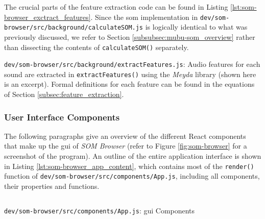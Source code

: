 \smallskip

The crucial parts of the feature extraction code can be found in Listing
\ref{lst:som-browser_exctract_features}. Since the \gls{som} implementation in
\texttt{dev/som-browser/src/background/calculateSOM.js} is logically identical
to what was previously discussed, we refer to Section
\ref{subsubsec:mubu-som_overview} rather than dissecting the contents of
\texttt{calculateSOM()} separately.

\begin{listing}[!htb]
  \caption[\texttt{dev/som-browser/src/background/extractFeatures.js}: Audio feature
  extraction]
  {\texttt{dev/som-browser/src/background/extractFeatures.js}: Audio features
  for each sound are extracted in \texttt{extractFeatures()} using the
  \textit{Meyda} library (shown here is an excerpt). Formal definitions for each
  feature can be found in the equations of Section
\ref{subsec:feature_extraction}.}
  \label{lst:som-browser_exctract_features}
\end{listing}

\subsubsection{User Interface Components}
\label{subsubsec:som-browser_components}
The following paragraphs give an overview of the different React components
that make up the \gls{gui} of \textit{SOM Browser} (refer to Figure
\ref{fig:som-browser} for a screenshot of the program). An outline of the entire
application interface is shown in Listing \ref{lst:som-browser_app_content},
which contains most of the \texttt{render()} function of
\texttt{dev/som-browser/src/components/App.js}, including all components, their
properties and functions.

\begin{listing}[!htb]
  \begin{mdframed}
    \inputminted[numbers=left, firstline=405, lastline=461,
    fontsize=\scriptsize]{jsx}{../dev/som-browser/src/components/App.js}
  \end{mdframed}
  \caption{\texttt{dev/som-browser/src/components/App.js}: \gls{gui} Components}
  \label{lst:som-browser_app_content}
\end{listing}

